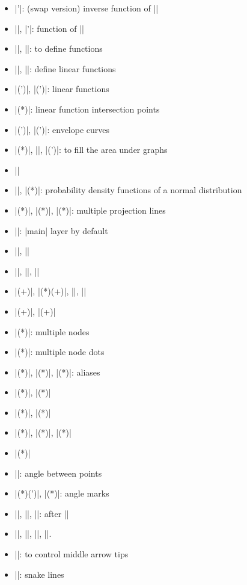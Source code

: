\begin{itemize}\tightlist
\item |\tzfn'|: (swap version) inverse function of |\tzfn|
\item |\tzfnofy|, |\tzfnofy'|: function of |\y|
\item |\tzdeffn|, |\tzdeffnofy|: to define functions
\item |\tzdefLFn|, |\tzdefLFnofy|: define linear functions
\item |\tzLFn(')|, |\tzLFnofy(')|: linear functions
\item |\tzLFnXpoint(*)|: linear function intersection points
\item |\tzfnmin(')|, |\tzfnmax(')|: envelope curves
%
\listdivider
\item |\tzfnarea(*)|, |\settzfnarealayer|, |\tzfnarealine(')|: to fill the area under graphs
\item |\settzfnarealinestyle|
\item |\tzpdfZ|, |\tzpdfN(*)|: probability density functions of a normal distribution
\item |\tzprojs(*)|, |\tzprojsx(*)|, |\tzprojsy(*)|: multiple projection lines
\item |\settzpathlayer|: |main| layer by default
%
\listdivider
\item |\tzslope|, |\tzslopeat|
\item |\settzslopelayer|, |\settzslopeatlayer|, |\settzslopeepsilon|
%
\listdivider
\item |\tzlink(+)|, |\tzlinks(*)(+)|, |\settzlinkstyle|, |\settzpathstyle|
\item |\tzedge(+)|, |\tzedges(+)|
%
\listdivider
\item |\tznodes(*)|: multiple nodes
\item |\tznodedots(*)|: multiple node dots
\item |\tznoderectangle(*)|, |\tznodebox(*)|, |\tznodeoval(*)|: aliases
%
\listdivider
\item |\tzring(*)|, |\tzcirclering(*)|
\item |\tzellipsering(*)|, |\tzovalring(*)|
\item |\tzrectanglering(*)|, |\tzframering(*)|, |\tzboxring(*)|
\item |\tzbox(*)|
%
\listdivider
\item |\tzpointangle|: angle between points
\item |\tzanglemark(*)(')|, |\tzrightanglemark(*)|: angle marks
\item |\tzangleresult|, |\tzangleONE|, |\tzangleTWO|: after |\tzanglemark|
\item |\settzAAlinestyle|, |\settzanglelayer|, |\settzAAradius|, |\settzRAsize|.
%
\listdivider
\item |\settzmidarrow|: to control middle arrow tips
\item |\tzsnake|: snake lines
\end{itemize}


